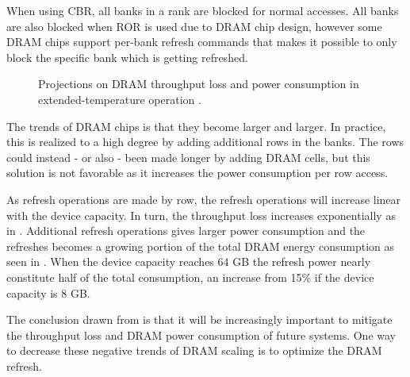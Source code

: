 When using CBR, all banks in a rank are blocked for normal accesses. All banks are also blocked when ROR is used due to DRAM chip design, however some DRAM chips support per-bank refresh commands that makes it possible to only block the specific bank which is getting refreshed. 

\begin{figure}[t]
    \centering
    \caption{Projections on DRAM throughput loss and power consumption in extended-temperature operation \cite{raidr}.}
    \label{fig:dram_data_proj}
\end{figure}

The trends of DRAM chips is that they become larger and larger. In practice, this is realized to a high degree by adding additional rows in the banks. The rows could instead - or also - been made longer by adding DRAM cells, but this solution is not favorable as it increases the power consumption per row access. 

As refresh operations are made by row, the refresh operations will increase linear with the device capacity. In turn, the throughput loss increases exponentially as in . Additional refresh operations gives larger power consumption and the refreshes becomes a growing portion of the total DRAM energy consumption as seen in . When the device capacity reaches 64 GB the refresh power nearly constitute half of the total consumption, an increase from 15\% if the device capacity is 8 GB. 

The conclusion drawn from  is that it will be increasingly important to mitigate the throughput loss and DRAM power consumption of future systems. One way to decrease these negative trends of DRAM scaling is to optimize the DRAM refresh.
